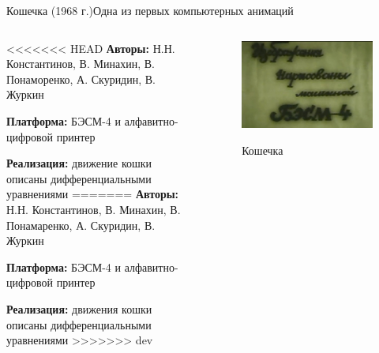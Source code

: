 \documentclass{beamer}
\begin{document}
\begin{frame}{Кошечка (1968 г.)}{Одна из первых компьютерных анимаций}
	
	\begin{columns}
		\begin{column}{0.5\textwidth}
			
<<<<<<< HEAD
			\textbf{Авторы:} Н.Н. Константинов, В. Минахин, В. Понаморенко, А. Скуридин, В. Журкин
			
			\textbf{Платформа:} БЭСМ-4 и алфавитно-цифровой принтер
			
			\textbf{Реализация:} движение кошки описаны дифференциальными уравнениями
=======
			\textbf{Авторы:} Н.Н. Константинов, В. Минахин, В. Понамаренко, А. Скуридин, В. Журкин
			
			\textbf{Платформа:} БЭСМ-4 и алфавитно-цифровой принтер
			
			\textbf{Реализация:} движения кошки описаны дифференциальными уравнениями
>>>>>>> dev
			
		\end{column}
		\begin{column}{0.5\textwidth}
			\begin{figure}
				\href{https://www.youtube.com/watch?v=LzMk5sC6eAU}{
				\includegraphics[width=\textwidth]{images/AnimatedCat.jpg}
				}
				\caption {Кошечка}
			\end{figure}
		\end{column}
	\end{columns}
\end{frame}
\end{document}

